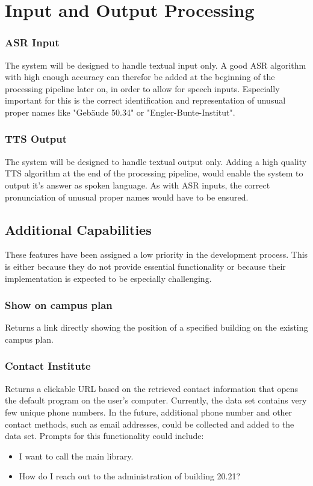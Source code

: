 \documentclass{article}
\begin{document}
\section{Input and Output Processing}

\subsubsection{ASR Input}
The system will be designed to handle textual input only. A good ASR algorithm with high enough accuracy can therefor be added at the beginning of the processing pipeline later on, in order to allow for speech inputs. Especially important for this is the correct identification and representation of unusual proper names like "Gebäude 50.34" or "Engler-Bunte-Institut".

\subsubsection{TTS Output}
The system will be designed to handle textual output only. Adding a high quality TTS algorithm at the end of the processing pipeline, would enable the system to output it's answer as spoken language. As with ASR inputs, the correct pronunciation of unusual proper names would have to be ensured.

\subsection{Additional Capabilities}
These features have been assigned a low priority in the development process. This is either because they do not provide essential functionality or because their implementation is expected to be especially challenging.

\subsubsection{Show on campus plan}
Returns a link directly showing the position of a specified building on the existing campus plan.

\subsubsection{Contact Institute}
Returns a clickable URL based on the retrieved contact information that opens the default program on the user's computer. Currently, the data set contains very few unique phone numbers. In the future, additional phone number and other contact methods, such as email addresses, could be collected and added to the data set. Prompts for this functionality could include:
  \begin{itemize}
    \item I want to call the main library.
    \item How do I reach out to the administration of building 20.21?
  \end{itemize}
\end{document}
